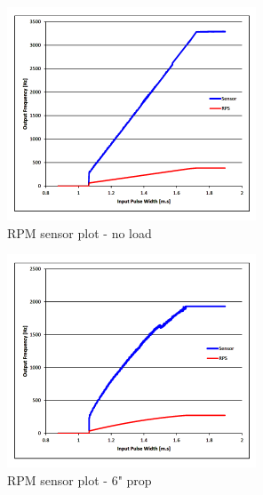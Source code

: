 \begin{figure}[htbp]
\begin{subfigure}{0.5\textwidth}
\centering
\includegraphics[width=\textwidth]{graphs/rpm-sensor-noload}
\caption{RPM sensor plot - no load}
\label{fig:rpm-sensor-noload}
\end{subfigure}
\begin{subfigure}{0.5\textwidth}
\centering
\includegraphics[width=\textwidth]{graphs/rpm-sensor-prop}
\caption{RPM sensor plot - 6" prop}
\label{fig:rpm-sensor-prop}
\end{subfigure}
\caption{}
\label{fig:rpm-sensor}
\end{figure}
